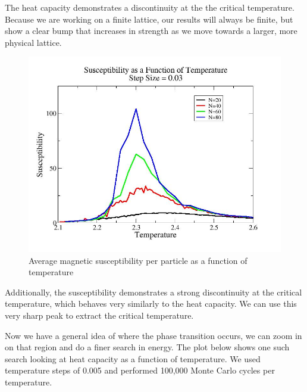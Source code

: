 \documentclass[%
oneside,                 %
final,                   %
10pt]{article}
\begin{document}
The heat capacity demonstrates a discontinuity at the the critical temperature.  Because we are working on a finite lattice, our results will always be finite, but show a clear bump that increases in strength as we move towards a larger, more physical lattice.

\begin{figure}[H]\label{fig:looseX}
  \centering
    \includegraphics[width=1.1 \textwidth]{susceptloose.jpg}
    \caption{Average magnetic susceptibility per particle as a function of temperature}
\end{figure}

Additionally, the susceptibility demonstrates a strong discontinuity at the critical temperature, which behaves very similarly to the heat capacity.  We can use this very sharp peak to extract the critical temperature.

Now we have a general idea of where the phase transition occurs, we can zoom in on that region and do a finer search in energy.  The plot below shows one such search looking at heat capacity as a function of temperature.  We used temperature steps of 0.005 and performed 100,000 Monte Carlo cycles per temperature. 
\end{document}
